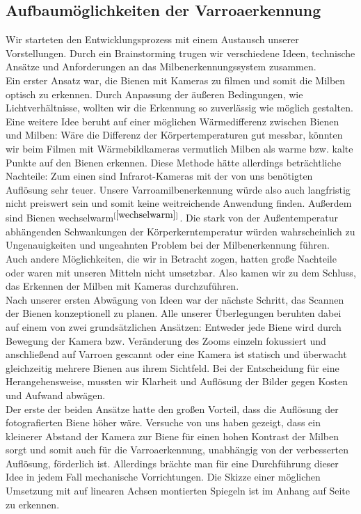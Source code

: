 \documentclass[11pt,a4paper]{article}
\newcommand{\bibRef}[1]{\hyperlink{#1}{$^{[\ref*{#1}{}]}$}}
\begin{document}
\subsection{Aufbaumöglichkeiten der Varroaerkennung}
Wir starteten den Entwicklungsprozess mit einem Austausch unserer Vorstellungen. Durch ein Brainstorming trugen wir verschiedene Ideen, technische Ansätze und Anforderungen an das Milbenerkennungssystem zusammen. \\
Ein erster Ansatz war, die Bienen mit Kameras zu filmen und somit die Milben optisch zu erkennen. Durch Anpassung der äußeren Bedingungen, wie Lichtverhältnisse, wollten wir die Erkennung so zuverlässig wie möglich gestalten.\\
Eine weitere Idee beruht auf einer möglichen Wärmedifferenz zwischen Bienen und Milben: Wäre die Differenz der Körpertemperaturen gut messbar, könnten wir beim Filmen mit Wärmebildkameras vermutlich Milben als warme bzw. kalte Punkte auf den Bienen erkennen. Diese Methode hätte allerdings beträchtliche Nachteile: Zum einen sind Infrarot-Kameras mit der von uns benötigten Auflösung sehr teuer. Unsere Varroamilbenerkennung würde also auch langfristig nicht preiswert sein und somit keine weitreichende Anwendung finden. Außerdem sind Bienen wechselwarm\bibRef{wechselwarm}. Die stark von der Außentemperatur abhängenden Schwankungen der Körperkerntemperatur würden wahrscheinlich zu Ungenauigkeiten und ungeahnten Problem bei der Milbenerkennung führen.\\
Auch andere Möglichkeiten, die wir in Betracht zogen, hatten große Nachteile oder waren mit unseren Mitteln nicht umsetzbar. Also kamen wir zu dem Schluss, das Erkennen der Milben mit Kameras durchzuführen.\\
Nach unserer ersten Abwägung von Ideen war der nächste Schritt, das Scannen der Bienen konzeptionell zu planen. Alle unserer Überlegungen beruhten dabei auf einem von zwei grundsätzlichen Ansätzen: Entweder jede Biene wird durch Bewegung der Kamera bzw. Veränderung des Zooms einzeln fokussiert und anschließend auf Varroen gescannt oder eine Kamera ist statisch und überwacht gleichzeitig mehrere Bienen aus ihrem Sichtfeld. Bei der Entscheidung für eine Herangehensweise, mussten wir Klarheit und Auflösung der Bilder gegen Kosten und Aufwand abwägen.\\
Der erste der beiden Ansätze hatte den großen Vorteil, dass die Auflösung der fotografierten Biene höher wäre. Versuche von uns haben gezeigt, dass ein kleinerer Abstand der Kamera zur Biene für einen hohen Kontrast der Milben sorgt und somit auch für die Varroaerkennung, unabhängig von der verbesserten Auflösung, förderlich ist. Allerdings brächte man für eine Durchführung dieser Idee in jedem Fall mechanische Vorrichtungen. Die Skizze einer möglichen Umsetzung mit auf linearen Achsen montierten Spiegeln ist im Anhang auf Seite \pageref*{fig:technical-sketch} \, zu erkennen.\\
\end{document}

